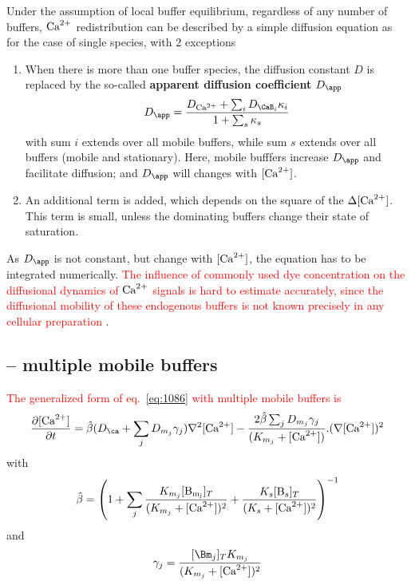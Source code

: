 Under the assumption of local buffer equilibrium, regardless of any number of
buffers, ${\text{Ca}^{2+}}$ redistribution can be described by a simple diffusion equation as
for the case of single species, with 2 exceptions
\begin{enumerate}
  \item  When there is more than one buffer species, the diffusion constant $D$
  is replaced by the so-called {\bf apparent diffusion coefficient} $D_\app$
\begin{equation}
D_\app = \frac{D_\Ca + \sum_i D_{\CaB_i} \kappa_i}{1+ \sum_s \kappa_s}
\end{equation}
with sum $i$ extends over all mobile buffers, while sum $s$ extends over all
buffers (mobile and stationary). Here, mobile bufffers increase $D_\app$ and
facilitate diffusion; and $D_\app$ will changes with $[{\text{Ca}^{2+}}]$.
 
  \item An additional term is added, which depends on the square of the $\Delta
  [{\text{Ca}^{2+}}]$. This term is small, unless the dominating buffers change their state
  of saturation.
\end{enumerate}
As $D_\app$ is not constant, but change with $[{\text{Ca}^{2+}}]$, the equation has to be
integrated numerically. \textcolor{red}{The influence of commonly used dye
concentration on the diffusional dynamics of ${\text{Ca}^{2+}}$ signals is hard to estimate
accurately, since the diffusional mobility of these endogenous buffers is not
known precisely in any cellular preparation} \citep{Neher1998}.



\subsection{-- multiple mobile buffers}
\label{sec:mult-mobile-buff}
\label{sec:with-mobile-buffers}

\textcolor{red}{The generalized form of eq.~\eqref{eq:1086} with
  multiple mobile buffers is}
\begin{equation}
  \label{eq:1087}
  \frac{\partial [\Ca]}{\partial t} =\hat{\beta}(D_\ca+\sum_jD_{m_j}\gamma_j)\nabla^2[\Ca] - \frac{2\hat{\beta} \sum_jD_{m_j}\gamma_j}{(K_{m_j}+[\Ca])}.(\nabla[\Ca])^2
\end{equation}
with
\begin{equation}
  \label{eq:1088}
  \hat{\beta} = \left( 1 +
    \sum_j\frac{K_{m_j}[\ce{B_{m_j}}]_T}{(K_{m_j}+[\Ca])^2}  + 
    \frac{K_s[\ce{B_s}]_T}{(K_s+[\Ca])^2} \right)^{-1}
\end{equation}
and
\begin{equation}
  \label{eq:1089}
  \gamma_j = \frac{[\Bm_j]_TK_{m_j}}{(K_{m_j}+[\Ca])^2}
\end{equation}

